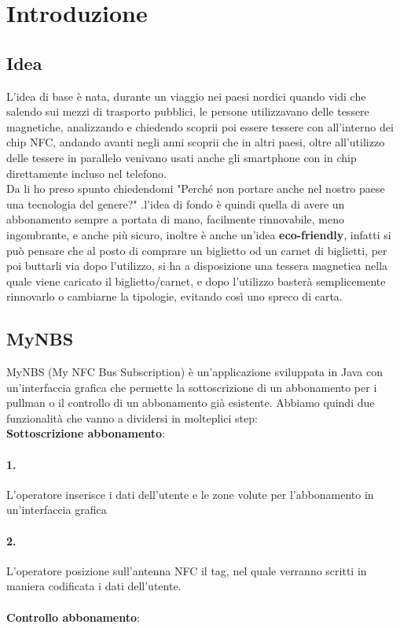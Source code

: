 \section{Introduzione}

\subsection{Idea}

L'idea di base è nata, durante un viaggio nei paesi nordici quando vidi che salendo sui mezzi di trasporto pubblici, le persone utilizzavano delle tessere magnetiche, analizzando e chiedendo scoprii poi essere tessere con all'interno dei chip NFC, andando avanti negli anni scoprii che in altri paesi, oltre all'utilizzo delle tessere in parallelo venivano usati anche gli smartphone con in chip direttamente incluso nel telefono.
\\Da li ho preso spunto chiedendomi "Perché non portare anche nel nostro paese una tecnologia del genere?" .l'idea di fondo è quindi quella di avere un abbonamento sempre a portata di mano, facilmente rinnovabile, meno ingombrante, e anche più sicuro, inoltre è anche un'idea \textbf{eco-friendly}, infatti si può pensare che al posto di comprare un biglietto od un carnet di biglietti, per poi buttarli via dopo l'utilizzo, si ha a disposizione una tessera magnetica nella quale viene caricato il biglietto/carnet, e dopo l'utilizzo basterà semplicemente rinnovarlo o cambiarne la tipologie, evitando così uno spreco di carta.

\subsection{MyNBS}

MyNBS (My NFC Bus Subscription) è un'applicazione sviluppata in Java con un'interfaccia grafica che permette la sottoscrizione di un abbonamento per i pullman o il controllo di un abbonamento già esistente. Abbiamo quindi due funzionalità che vanno a dividersi in molteplici step: 
\\ \textbf{Sottoscrizione abbonamento}:
\paragraph{1.} L'operatore inserisce i dati dell'utente e le zone volute per l'abbonamento in un'interfaccia grafica
\paragraph{2.} L'operatore posizione sull'antenna NFC il tag, nel quale verranno scritti in maniera codificata i dati dell'utente.
\bigskip
\\\\\textbf{Controllo abbonamento}:
